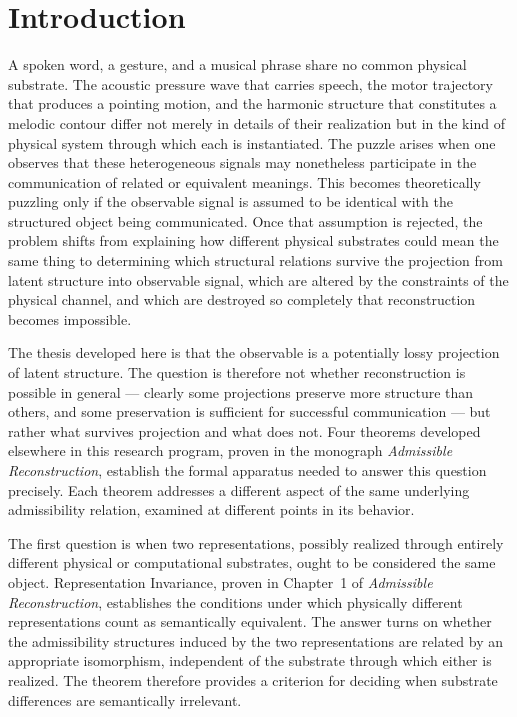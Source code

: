 \chapter{Introduction}
\label{ch:essay-intro}

A spoken word, a gesture, and a musical phrase share no common physical substrate. The acoustic pressure wave that carries speech, the motor trajectory that produces a pointing motion, and the harmonic structure that constitutes a melodic contour differ not merely in details of their realization but in the kind of physical system through which each is instantiated. The puzzle arises when one observes that these heterogeneous signals may nonetheless participate in the communication of related or equivalent meanings. This becomes theoretically puzzling only if the observable signal is assumed to be identical with the structured object being communicated. Once that assumption is rejected, the problem shifts from explaining how different physical substrates could mean the same thing to determining which structural relations survive the projection from latent structure into observable signal, which are altered by the constraints of the physical channel, and which are destroyed so completely that reconstruction becomes impossible.

The thesis developed here is that the observable is a potentially lossy projection of latent structure. The question is therefore not whether reconstruction is possible in general — clearly some projections preserve more structure than others, and some preservation is sufficient for successful communication — but rather what survives projection and what does not. Four theorems developed elsewhere in this research program, proven in the monograph \emph{Admissible Reconstruction}, establish the formal apparatus needed to answer this question precisely. Each theorem addresses a different aspect of the same underlying admissibility relation, examined at different points in its behavior.

The first question is when two representations, possibly realized through entirely different physical or computational substrates, ought to be considered the same object. Representation Invariance, proven in Chapter~1 of \emph{Admissible Reconstruction}, establishes the conditions under which physically different representations count as semantically equivalent. The answer turns on whether the admissibility structures induced by the two representations are related by an appropriate isomorphism, independent of the substrate through which either is realized. The theorem therefore provides a criterion for deciding when substrate differences are semantically irrelevant.

